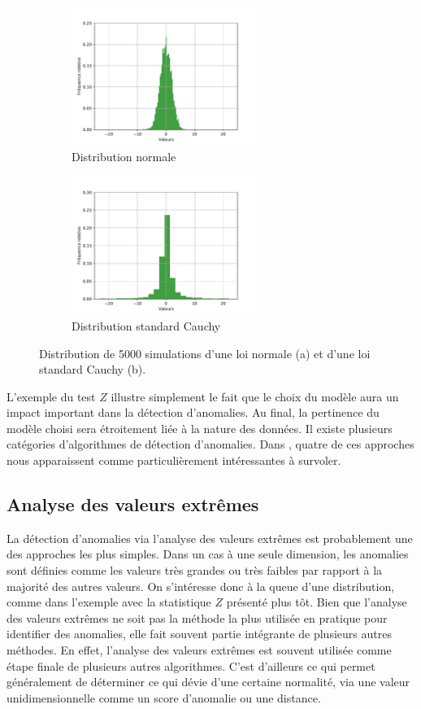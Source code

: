 \begin{figure}[htb]
	\centering
	\begin{subfigure}{6cm}
		\centering\includegraphics[width=6cm]{images/histogram-normal-ztest}
		\caption{Distribution normale}
		\label{fig:Ztest_a}
	\end{subfigure}
	\begin{subfigure}{6cm}
		\centering\includegraphics[width=6cm]{images/histogram-cauchy-ztest}
		\caption{Distribution standard Cauchy}
		\label{fig:Ztest_b}
	\end{subfigure}
	\caption{Distribution de 5000 simulations d'une loi normale (a) et d'une loi standard Cauchy (b).}
	\label{fig:ZTest}
\end{figure}

L'exemple du test $Z$ illustre simplement le fait que le choix du modèle aura un impact important dans la détection d'anomalies. Au final, la pertinence du modèle choisi sera étroitement liée à la nature des données. Il existe plusieurs catégories d'algorithmes de détection d'anomalies. Dans \cite{10.5555/3086742}, quatre de ces approches nous apparaissent comme particulièrement intéressantes à survoler.

\subsection{Analyse des valeurs extrêmes}

La détection d'anomalies via l'analyse des valeurs extrêmes est probablement une des approches les plus simples. Dans un cas à une seule dimension, les anomalies sont définies comme les valeurs très grandes ou très faibles par rapport à la majorité des autres valeurs. On s'intéresse donc à la queue d'une distribution, comme dans l'exemple avec la statistique $Z$ présenté plus tôt. Bien que l'analyse des valeurs extrêmes ne soit pas la méthode la plus utilisée en pratique pour identifier des anomalies, elle fait souvent partie intégrante de plusieurs autres méthodes. En effet, l'analyse des valeurs extrêmes est souvent utilisée comme étape finale de plusieurs autres algorithmes. C'est d'ailleurs ce qui permet généralement de déterminer ce qui dévie d'une certaine normalité, via une valeur unidimensionnelle comme un score d'anomalie ou une distance.


